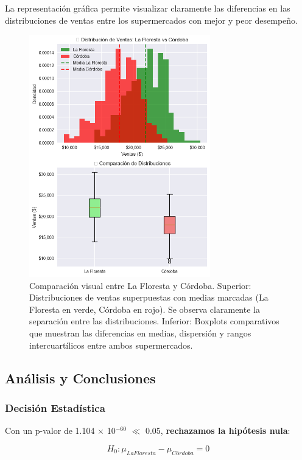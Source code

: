 \documentclass[11pt,a4paper]{article}
\begin{document}
La representación gráfica permite visualizar claramente las diferencias en las distribuciones de ventas entre los supermercados con mejor y peor desempeño.

\begin{figure}[H]
\centering
\includegraphics[width=0.7\textwidth]{../data/output3.png}
\caption{Comparación visual entre La Floresta y Córdoba. Superior: Distribuciones de ventas superpuestas con medias marcadas (La Floresta en verde, Córdoba en rojo). Se observa claramente la separación entre las distribuciones. Inferior: Boxplots comparativos que muestran las diferencias en medias, dispersión y rangos intercuartílicos entre ambos supermercados.}
\label{fig:comparacion_extremos}
\end{figure}

\subsection{Análisis y Conclusiones}

\subsubsection{Decisión Estadística}

Con un p-valor de 1.104 $\times$ 10$^{-60}$ $\ll$ 0.05, \textbf{rechazamos la hipótesis nula}:

$$H_0: \mu_{La Floresta} - \mu_{Córdoba} = 0$$
\end{document}
